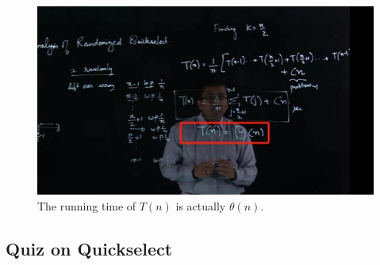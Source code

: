 \documentclass{article}
\begin{document}
\begin{figure}[H]
    \includegraphics[width=\textwidth]{quickselectrunningtime.png}
    \caption{The running time of $T(n)$ is actually $\theta(n)$.\\}
\end{figure}

\subsection{Quiz on Quickselect}
\end{document}
